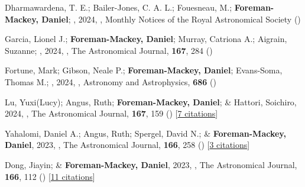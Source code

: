 \item[{\color{numcolor}\scriptsize104}] Dharmawardena, T. E.; Bailer-Jones, C. A. L.; Fouesneau, M.; \textbf{Foreman-Mackey, Daniel}; \etal, 2024, , Monthly Notices of the Royal Astronomical Society ()

\item[{\color{numcolor}\scriptsize103}] Garcia, Lionel J.; \textbf{Foreman-Mackey, Daniel}; Murray, Catriona A.; Aigrain, Suzanne; \etal, 2024, , The Astronomical Journal, \textbf{167}, 284 ()

\item[{\color{numcolor}\scriptsize102}] Fortune, Mark; Gibson, Neale P.; \textbf{Foreman-Mackey, Daniel}; Evans-Soma, Thomas M.; \etal, 2024, , Astronomy and Astrophysics, \textbf{686} ()

\item[{\color{numcolor}\scriptsize101}] Lu, Yuxi(Lucy); Angus, Ruth; \textbf{Foreman-Mackey, Daniel}; \& Hattori, Soichiro, 2024, , The Astronomical Journal, \textbf{167}, 159 () [\href{https://ui.adsabs.harvard.edu/abs/2024AJ....167..159L}{7 citations}]

\item[{\color{numcolor}\scriptsize100}] Yahalomi, Daniel A.; Angus, Ruth; Spergel, David N.; \& \textbf{Foreman-Mackey, Daniel}, 2023, , The Astronomical Journal, \textbf{166}, 258 () [\href{https://ui.adsabs.harvard.edu/abs/2023AJ....166..258Y}{3 citations}]

\item[{\color{numcolor}\scriptsize99}] Dong, Jiayin; \& \textbf{Foreman-Mackey, Daniel}, 2023, , The Astronomical Journal, \textbf{166}, 112 () [\href{https://ui.adsabs.harvard.edu/abs/2023AJ....166..112D}{11 citations}]

